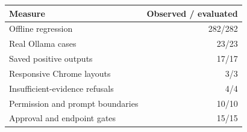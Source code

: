 \begin{tabular}{lr}
\toprule
Measure & Observed / evaluated \\
\midrule
Offline regression & 282/282 \\
Real Ollama cases & 23/23 \\
Saved positive outputs & 17/17 \\
Responsive Chrome layouts & 3/3 \\
Insufficient-evidence refusals & 4/4 \\
Permission and prompt boundaries & 10/10 \\
Approval and endpoint gates & 15/15 \\
\bottomrule
\end{tabular}
